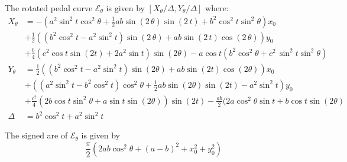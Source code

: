 
The rotated pedal curve $\mathcal{E}_{\theta}$ is given by
$[X_\theta/\Delta,Y_\theta/\Delta]$ where:
\begin{align*}
 X_\theta &=  - 
  \left(     {a}^{2}  \sin^2  t   
\cos^2\theta +\frac{1}{2} a b\sin \left( 2\,\theta
 \right)  \sin \left( 2\,t \right) +  b^2  \cos^2 t 
  \sin^2\theta  
 \right) {x_0} \\
&+ \frac{1}{2} \left(  (b^2
  \cos^2 t   - {a}^{2} \sin^2t)\sin \left( 2\,\theta \right)
  +ab\sin
 \left( 2\,t \right) \cos \left( 2\,\theta \right)   \right)  y_0
 \\
 &+ \frac{b}{4}(c^2 \cos t \sin(2t) + 2 a^2 \sin{ t} )\sin(2\theta) - a \cos t (b^2\cos^2\theta + c^2\, \sin^2 t\sin^2\theta) 
 \\
 Y_\theta&= \frac{1}{2} \left( (  b^2  \cos^2t -   a^2\sin ^2{t} )  \sin(2\theta)+ a b  \sin (2t)  \cos(2  \theta)       \right)  x_0\\
 &+ \left(  (    a^2 \sin ^2{t}-b^2\cos^2t) \cos^2\theta   +\frac{1}{2} a b  \sin(2\theta)     \sin(2 t)  - a^2  \sin ^2{t}\right)  y_0\\
 &+  \frac{c^2}{4}  \left(2b \cos t\sin^2\theta+ a  \sin {t}   \sin(2\theta)    \right)  \sin(2 t) 
  -\frac{ab}{2}(2a \cos^2\theta  \sin {t}   +b \cos{t}  \sin(2\theta)  
   \\
 \Delta&={b}^{2}   \cos^2 t +{a}^{2}\sin^2t
\end{align*}

\begin{proposition}
The signed are of $\mathcal{E}_\theta$
is given by
\[\frac{\pi}{2}(2ab\cos^2\theta + (a - b)^2 + x_0^2 + y_0^2) \]
\end{proposition}